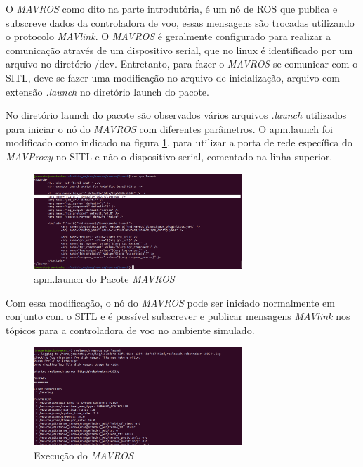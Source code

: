 \documentclass[12pt,a4paper,oneside]{book}
\begin{document}
O \textit{MAVROS} como dito na parte introdutória, é um nó de ROS que publica e subscreve dados da controladora de voo, essas mensagens são trocadas utilizando o protocolo \textit{MAVlink}. O \textit{MAVROS} é geralmente configurado para realizar a comunicação através de um dispositivo serial, que no linux é identificado por um arquivo no diretório /dev. Entretanto, para fazer o \textit{MAVROS} se comunicar com o SITL, deve-se fazer uma modificação no arquivo de inicialização, arquivo com extensão \textit{.launch} no diretório launch do pacote.

No diretório launch do pacote são observados vários arquivos \textit{.launch} utilizados para iniciar o nó do \textit{MAVROS} com diferentes parâmetros. O apm.launch foi modificado como indicado na figura \ref{fig:mavros_launch.png.0}, para utilizar a porta de rede específica do \textit{MAVProxy} no SITL e não o dispositivo serial, comentado na linha superior.
%
\begin{figure}[H]
  \centering
  \includegraphics[width=0.7\textwidth]{Images/Desenvolvimento/mavros_launch.png}
  \caption{apm.launch do Pacote \textit{MAVROS}}
  \label{fig:mavros_launch.png.0}
\end{figure}
%
Com essa modificação, o nó do \textit{MAVROS} pode ser iniciado normalmente em conjunto com o SITL e é possível subscrever e publicar mensagens \textit{MAVlink} nos tópicos para a controladora de voo no ambiente simulado. 
%
\begin{figure}[H]
  \centering
  \includegraphics[width=0.7\textwidth]{Images/Desenvolvimento/mavros_execution.png}
  \caption{Execução do \textit{MAVROS}}
  \label{fig:mavros_execution.png.0}
\end{figure}
\end{document}
